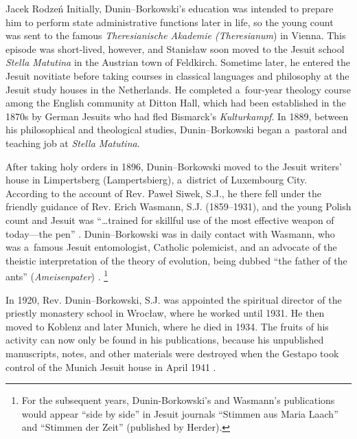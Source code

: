 \begin{artengenv}{Jacek Rodzeń}
Initially, Dunin–Borkowski's education was intended to prepare him to perform state administrative functions later in life, so the young count was sent to the famous \textit{Theresianische Akademie (Theresianum}) in Vienna. This episode was short-lived, however, and Stanisław soon moved to the Jesuit school \textit{Stella Matutina} in the Austrian town of Feldkirch. Sometime later, he entered the Jesuit novitiate before taking courses in classical languages and philosophy at the Jesuit study houses in the Netherlands. He completed a~four-year theology course among the English community at Ditton Hall, which had been established in the 1870s by German Jesuits who had fled Bismarck's \textit{Kulturkampf}. In 1889, between his philosophical and theological studies, Dunin–Borkowski began a~pastoral and teaching job at \textit{Stella Matutina}.

After taking holy orders in 1896, Dunin–Borkowski moved to the Jesuit writers' house in Limpertsberg (Lampertsbierg), a~district of Luxembourg City. According to the account of Rev. Paweł Siwek, S.J., he there fell under the friendly guidance of Rev. Erich Wasmann, S.J. (1859–1931), and the young Polish count and Jesuit was ``…trained for skillful use of the most effective weapon of today---the pen''
\parencite[][p.137]{siwek_stanislaw_1935}. %
 Dunin–Borkowski was in daily contact with Wasmann, who was a~famous Jesuit entomologist, Catholic polemicist, and an advocate of the theistic interpretation of the theory of evolution, being dubbed ``the father of the ants'' (\textit{Ameisenpater}) 
\parencites[for more on Wasmann's activity see][]{baranzke_erich_1999}[][]{polak_spor_2007}.%
\footnote{For the subsequent years, Dunin-Borkowski's and Wasmann's publications would appear ``side by side'' in Jesuit journals ``Stimmen aus Maria Laach'' and ``Stimmen der Zeit'' (published by Herder).}

In 1920, Rev. Dunin–Borkowski, S.J. was appointed the spiritual director of the priestly monastery school in Wrocław, where he worked until 1931. He then moved to Koblenz and later Munich, where he died in 1934. The fruits of his activity can now only be found in his publications, because his unpublished manuscripts, notes, and other materials were destroyed when the Gestapo took control of the Munich Jesuit house in April 1941
\parencite[][]{stasiewski_dunin-borkowski_1959}.%



\end{artengenv}
